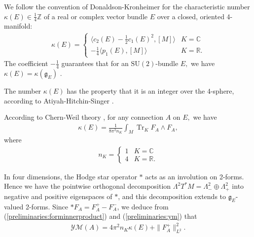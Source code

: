\documentclass[12pt]{amsart}
\newcommand{\Tr}{\operatorname{Tr}}
\newcommand{\YM}{\mathcal{YM}}
\newcommand{\Z}{{\mathbb Z}}
\newcommand{\C}{{\mathbb C}}
\renewcommand{\1}{{\mathbf 1}}
\newcommand{\R}{{\mathbb R}}
\newcommand{\SU}{{\mathrm{SU} }}
\newcommand{\SO}{{\mathrm{SO} }}
\newcommand{\gothg}{{\mathfrak g}}
\theoremstyle{others}
\numberwithin{equation}{section}
\begin{document}
We follow the convention of Donaldson-Kronheimer \cite[p. 42]{donkron} for the characteristic number $\kappa(E) \in \frac14 \Z$ of a real or complex vector bundle \(E\) over a closed, oriented 4-manifold:
\begin{align*}
    \kappa(E) = \begin{cases} \langle c_2(E) - \frac12 c_1(E)^2, [M]\rangle & K = \C \\
    -\frac14 \langle p_1(E), [M]\rangle & K = \R.
    \end{cases}
\end{align*}
The coefficient $-\frac14$ guarantees %
that for an $\text{SU}(2)$-bundle $E,$ %
we have $\kappa(E) = \kappa(\gothg_E)$ %
\cite[(2.1.37)]{donkron}. %

The number \(\kappa(E)\) has the property that it is an integer over the 4-sphere, according to Atiyah-Hitchin-Singer \cite[pg. 450]{ahs}.

According to Chern-Weil theory \cite[Appendix C]{milnorstasheff}, for any %
connection $A$ on $E,$ we have
\begin{align*}
    \kappa(E) = \frac{1}{8\pi^2 n_{K}} \int_M \Tr_K F_A \wedge F_A,
\end{align*}
where
\begin{align}\label{preliminaries:nK}
    n_{K} = \begin{cases} 1 & K = \C \\
    4 & K = \R.
    \end{cases}
\end{align} \par 
In four dimensions, the Hodge star operator \(\ast\) acts as an involution on 2-forms. Hence we have the pointwise orthogonal decomposition \(\Lambda^2T^\ast M = \Lambda_-^2 \oplus \Lambda_+^2\) into negative and positive eigenspaces of \(\ast\), and this decomposition extends to \(\mathfrak{g}_E\)-valued 2-forms. Since \(\ast F_A = F_A^+ - F_A^-\), we deduce from (\ref{preliminaries:forminnerproduct}) and (\ref{preliminaries:ym}) that
\begin{align*} 
    \YM(A) = 4 \pi^2 n_{K} \kappa(E) + \|F^+_A\|_{L^2}^2.
\end{align*} \par
\end{document}
